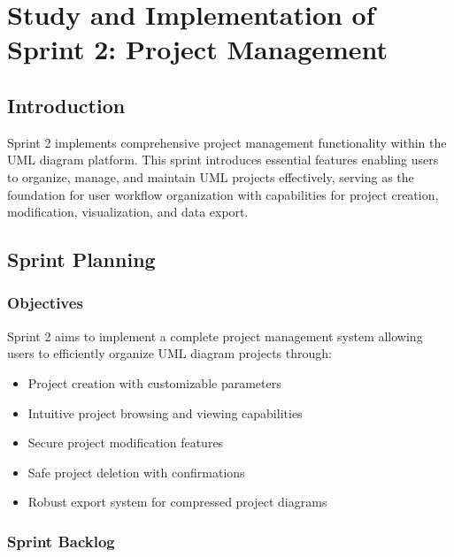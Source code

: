\chapter[Sprint 2]{Study and Implementation of Sprint 2: Project Management}

\section{Introduction}

Sprint 2 implements comprehensive project management functionality within the UML diagram platform. This sprint introduces essential features enabling users to organize, manage, and maintain UML projects effectively, serving as the foundation for user workflow organization with capabilities for project creation, modification, visualization, and data export.

\section{Sprint Planning}

\subsection{Objectives}
Sprint 2 aims to implement a complete project management system allowing users to efficiently organize UML diagram projects through:
\begin{itemize}
    \item Project creation with customizable parameters
    \item Intuitive project browsing and viewing capabilities
    \item Secure project modification features
    \item Safe project deletion with confirmations
    \item Robust export system for compressed project diagrams
\end{itemize}

\subsection{Sprint Backlog}


